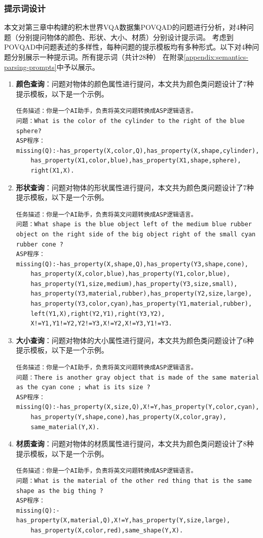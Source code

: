 \subsubsection{提示词设计}
本文对第三章中构建的积木世界VQA数据集POVQAD的问题进行分析，对4种问题（分别提问物体的颜色、形状、大小、材质）分别设计提示词。
考虑到POVQAD中问题表述的多样性，每种问题的提示模板均有多种形式。以下对4种问题分别展示一种提示词。所有提示词（共计28种）
在附录\ref{appendix:semantics-parsing-prompts}中予以展示。
\begin{enumerate}[nosep]
\item \textbf{颜色查询}：问题对物体的颜色属性进行提问，本文共为颜色类问题设计了7种提示模板，以下是一个示例。
\begin{lstlisting}
任务描述：你是一个AI助手，负责将英文问题转换成ASP逻辑语言。
问题：What is the color of the cylinder to the right of the blue sphere?
ASP程序：
missing(Q):-has_property(X,color,Q),has_property(X,shape,cylinder),
    has_property(X1,color,blue),has_property(X1,shape,sphere),
    right(X1,X).
\end{lstlisting}
\item \textbf{形状查询}：问题对物体的形状属性进行提问，本文共为颜色类问题设计了7种提示模板，以下是一个示例。
\begin{lstlisting}
任务描述：你是一个AI助手，负责将英文问题转换成ASP逻辑语言。
问题：What shape is the blue object left of the medium blue rubber object on the right side of the big object right of the small cyan rubber cone ?
ASP程序：
missing(Q):-has_property(X,shape,Q),has_property(Y3,shape,cone),
    has_property(X,color,blue),has_property(Y1,color,blue),
    has_property(Y1,size,medium),has_property(Y3,size,small),
    has_property(Y3,material,rubber),has_property(Y2,size,large),
    has_property(Y3,color,cyan),has_property(Y1,material,rubber),
    left(Y1,X),right(Y2,Y1),right(Y3,Y2),
    X!=Y1,Y1!=Y2,Y2!=Y3,X!=Y2,X!=Y3,Y1!=Y3.
\end{lstlisting}
\item \textbf{大小查询}：问题对物体的大小属性进行提问，本文共为颜色类问题设计了6种提示模板，以下是一个示例。
\begin{lstlisting}
任务描述：你是一个AI助手，负责将英文问题转换成ASP逻辑语言。
问题：There is another gray object that is made of the same material as the cyan cone ; what is its size ? 
ASP程序：
missing(Q):-has_property(X,size,Q),X!=Y,has_property(Y,color,cyan),
    has_property(Y,shape,cone),has_property(X,color,gray),
    same_material(Y,X).
\end{lstlisting}
\item \textbf{材质查询}：问题对物体的材质属性进行提问，本文共为颜色类问题设计了8种提示模板，以下是一个示例。
\begin{lstlisting}
任务描述：你是一个AI助手，负责将英文问题转换成ASP逻辑语言。
问题：What is the material of the other red thing that is the same shape as the big thing ? 
ASP程序：
missing(Q):-has_property(X,material,Q),X!=Y,has_property(Y,size,large),
    has_property(X,color,red),same_shape(Y,X).
\end{lstlisting}
\end{enumerate}

